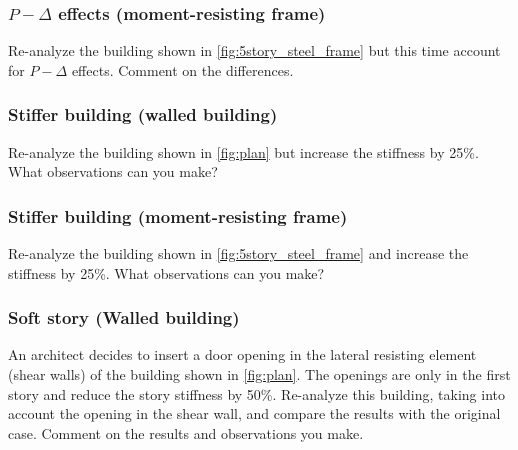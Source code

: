 \documentclass{simcenterdocumentation}
\begin{document}
\subsubsection{$P-\Delta$ effects (moment-resisting frame)} Re-analyze the building shown in \cref{fig:5story_steel_frame} but this time account for $P-\Delta$ effects. Comment on the differences.

\subsubsection{Stiffer building (walled building)} Re-analyze the building shown in \cref{fig:plan} but increase the stiffness by 25\%. What observations can you make?

\subsubsection{Stiffer building (moment-resisting frame)} Re-analyze the building shown in \cref{fig:5story_steel_frame} and increase the stiffness by 25\%. What observations can you make?

\subsubsection{Soft story (Walled building)} An architect decides to insert a door opening in the lateral resisting element (shear walls) of the building shown in \cref{fig:plan}. The openings are only in the first story and reduce the story stiffness by 50\%. Re-analyze this building, taking into account the opening in the shear wall, and compare the results with the original case. Comment on the results and observations you make.
\end{document}
